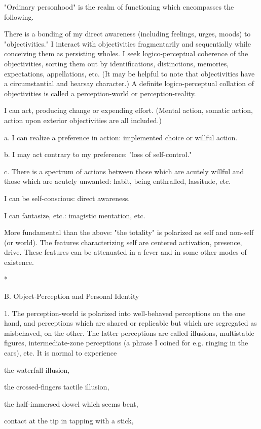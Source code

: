 "Ordinary personhood" is the realm of functioning which encompasses the following.

There is a bonding of my direct awareness (including feelings, urges, moods) to "objectivities." I interact with objectivities fragmentarily and sequentially while conceiving them as persisting wholes. I seek logico-perceptual coherence of the objectivities, sorting them out by identifications, distinctions, memories, expectations, appellations, etc. (It may be helpful to note that objectivities have a circumstantial and hearsay character.) A definite logico-perceptual collation of objectivities is called a perception-world or perception-reality.

I can act, producing change or expending effort. (Mental action, somatic action, action upon exterior objectivities are all included.)

    a. I can realize a preference in action: implemented choice or willful action.

    b. I may act contrary to my preference: "loss of self-control."

    c. There is a spectrum of actions between those which are acutely willful and those which are acutely unwanted: habit, being enthralled, lassitude, etc. 

I can be self-conscious: direct awareness.

I can fantasize, etc.: imagistic mentation, etc.

More fundamental than the above: "the totality" is polarized as self and non-self (or world). The features characterizing self are centered activation, presence, drive. These features can be attenuated in a fever and in some other modes of existence.

*

B. Object-Perception and Personal Identity

1. The perception-world is polarized into well-behaved perceptions on the one hand, and perceptions which are shared or replicable but which are segregated as misbehaved, on the other. The latter perceptions are called illusions, multistable figures, intermediate-zone perceptions (a phrase I coined for e.g. ringing in the ears), etc. It is normal to experience

    the waterfall illusion,

    the crossed-fingers tactile illusion,

    the half-immersed dowel which seems bent,

    contact at the tip in tapping with a stick,

